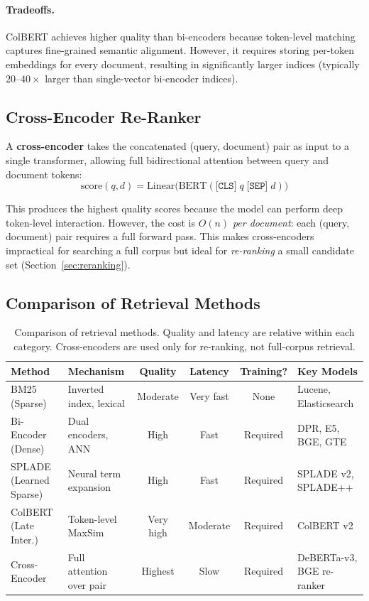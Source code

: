 \paragraph{Tradeoffs.}
ColBERT achieves higher quality than bi-encoders because token-level matching
captures fine-grained semantic alignment.  However, it requires storing
per-token embeddings for every document, resulting in significantly larger
indices (typically $20$--$40\times$ larger than single-vector bi-encoder indices).

\subsection{Cross-Encoder Re-Ranker}

A \textbf{cross-encoder} takes the concatenated (query, document) pair as
input to a single transformer, allowing full bidirectional attention between
query and document tokens:
\[
    \text{score}(q, d) = \text{Linear}\!\bigl(\text{BERT}(\texttt{[CLS]}\; q \;\texttt{[SEP]}\; d)\bigr)
\]

This produces the highest quality scores because the model can perform deep
token-level interaction.  However, the cost is $O(n)$ \emph{per document}:
each (query, document) pair requires a full forward pass.  This makes
cross-encoders impractical for searching a full corpus but ideal for
\emph{re-ranking} a small candidate set (Section~\ref{sec:reranking}).

\subsection{Comparison of Retrieval Methods}

\begin{table}[H]
\centering
\small
\begin{tabularx}{\textwidth}{@{}l l c c c X@{}}
\toprule
\textbf{Method} & \textbf{Mechanism} & \textbf{Quality} & \textbf{Latency} & \textbf{Training?} & \textbf{Key Models} \\
\midrule
BM25 (Sparse)       & Inverted index, lexical  & Moderate & Very fast & None    & Lucene, Elasticsearch \\
Bi-Encoder (Dense)   & Dual encoders, ANN       & High     & Fast      & Required & DPR, E5, BGE, GTE \\
SPLADE (Learned Sparse) & Neural term expansion & High     & Fast      & Required & SPLADE v2, SPLADE++ \\
ColBERT (Late Inter.)  & Token-level MaxSim     & Very high & Moderate & Required & ColBERT v2 \\
Cross-Encoder        & Full attention over pair  & Highest  & Slow      & Required & DeBERTa-v3, BGE re-ranker \\
\bottomrule
\end{tabularx}
\caption{Comparison of retrieval methods.  Quality and latency are relative
within each category.  Cross-encoders are used only for re-ranking, not
full-corpus retrieval.}
\label{tab:retrieval-comparison}
\end{table}


